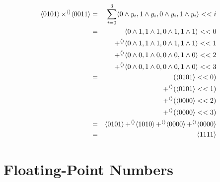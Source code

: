 \begin{example}[$5 \times 3$]
  \begin{align*}
    \langle 0101 \rangle \operatorname{\times^{\langle\rangle}} \langle 0011 \rangle &=& \sum_{i=0}^{3} \langle 0 \land y_{i},1\land y_{i}, 0\land y_{i}, 1 \land y_{i} \rangle << i \\
                                              &=& \langle 0 \land 1,1\land 1, 0\land 1, 1 \land 1 \rangle << 0 \\
                                              &&\operatorname{+^{\langle\rangle}} \langle 0 \land 1,1\land 1, 0\land 1, 1 \land 1 \rangle << 1 \\
                                              &&\operatorname{+^{\langle\rangle}} \langle 0 \land 0,1\land 0, 0\land 0, 1 \land 0 \rangle << 2 \\
                                              &&\operatorname{+^{\langle\rangle}} \langle 0 \land 0,1\land 0, 0\land 0, 1 \land 0 \rangle << 3 \\
                                              &=&         (\langle 0101 \rangle << 0) \\
    &&\operatorname{+^{\langle\rangle}} (\langle 0101 \rangle << 1) \\
    && \operatorname{+^{\langle\rangle}} (\langle 0000 \rangle << 2) \\
                                              && \operatorname{+^{\langle\rangle}} (\langle 0000 \rangle << 3) \\
                                              &=& \langle 0101 \rangle \operatorname{+^{\langle\rangle}} \langle 1010 \rangle \operatorname{+^{\langle\rangle}} \langle 0000 \rangle  \operatorname{+^{\langle\rangle}} \langle 0000 \rangle \\
    &=& \langle 1111 \rangle
  \end{align*}
\end{example}

\section{Floating-Point Numbers}
\label{sec:floats}

